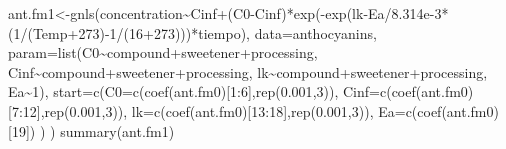 \documentclass[
]{article}
\newenvironment{Shaded}{\begin{snugshade}}{\end{snugshade}}
\newcommand{\AttributeTok}[1]{\textcolor[rgb]{0.77,0.63,0.00}{#1}}
\newcommand{\DecValTok}[1]{\textcolor[rgb]{0.00,0.00,0.81}{#1}}
\newcommand{\FloatTok}[1]{\textcolor[rgb]{0.00,0.00,0.81}{#1}}
\newcommand{\FunctionTok}[1]{\textcolor[rgb]{0.00,0.00,0.00}{#1}}
\newcommand{\NormalTok}[1]{#1}
\newcommand{\OtherTok}[1]{\textcolor[rgb]{0.56,0.35,0.01}{#1}}
\newcommand{\SpecialCharTok}[1]{\textcolor[rgb]{0.00,0.00,0.00}{#1}}
\begin{document}
\begin{Shaded}
\begin{Highlighting}[]
\NormalTok{ant.fm1}\OtherTok{\textless{}{-}}\FunctionTok{gnls}\NormalTok{(concentration}\SpecialCharTok{\textasciitilde{}}\NormalTok{Cinf}\SpecialCharTok{+}\NormalTok{(C0}\SpecialCharTok{{-}}\NormalTok{Cinf)}\SpecialCharTok{*}\FunctionTok{exp}\NormalTok{(}\SpecialCharTok{{-}}\FunctionTok{exp}\NormalTok{(lk}\SpecialCharTok{{-}}\NormalTok{Ea}\SpecialCharTok{/}\FloatTok{8.314e{-}3}\SpecialCharTok{*}\NormalTok{(}\DecValTok{1}\SpecialCharTok{/}\NormalTok{(Temp}\SpecialCharTok{+}\DecValTok{273}\NormalTok{)}\SpecialCharTok{{-}}\DecValTok{1}\SpecialCharTok{/}\NormalTok{(}\DecValTok{16}\SpecialCharTok{+}\DecValTok{273}\NormalTok{)))}\SpecialCharTok{*}\NormalTok{tiempo),}
              \AttributeTok{data=}\NormalTok{anthocyanins,}
              \AttributeTok{param=}\FunctionTok{list}\NormalTok{(C0}\SpecialCharTok{\textasciitilde{}}\NormalTok{compound}\SpecialCharTok{+}\NormalTok{sweetener}\SpecialCharTok{+}\NormalTok{processing,}
\NormalTok{                         Cinf}\SpecialCharTok{\textasciitilde{}}\NormalTok{compound}\SpecialCharTok{+}\NormalTok{sweetener}\SpecialCharTok{+}\NormalTok{processing,}
\NormalTok{                         lk}\SpecialCharTok{\textasciitilde{}}\NormalTok{compound}\SpecialCharTok{+}\NormalTok{sweetener}\SpecialCharTok{+}\NormalTok{processing,}
\NormalTok{                         Ea}\SpecialCharTok{\textasciitilde{}}\DecValTok{1}\NormalTok{),}
              \AttributeTok{start=}\FunctionTok{c}\NormalTok{(}\AttributeTok{C0=}\FunctionTok{c}\NormalTok{(}\FunctionTok{coef}\NormalTok{(ant.fm0)[}\DecValTok{1}\SpecialCharTok{:}\DecValTok{6}\NormalTok{],}\FunctionTok{rep}\NormalTok{(}\FloatTok{0.001}\NormalTok{,}\DecValTok{3}\NormalTok{)),}
                      \AttributeTok{Cinf=}\FunctionTok{c}\NormalTok{(}\FunctionTok{coef}\NormalTok{(ant.fm0)[}\DecValTok{7}\SpecialCharTok{:}\DecValTok{12}\NormalTok{],}\FunctionTok{rep}\NormalTok{(}\FloatTok{0.001}\NormalTok{,}\DecValTok{3}\NormalTok{)),}
                      \AttributeTok{lk=}\FunctionTok{c}\NormalTok{(}\FunctionTok{coef}\NormalTok{(ant.fm0)[}\DecValTok{13}\SpecialCharTok{:}\DecValTok{18}\NormalTok{],}\FunctionTok{rep}\NormalTok{(}\FloatTok{0.001}\NormalTok{,}\DecValTok{3}\NormalTok{)),}
                      \AttributeTok{Ea=}\FunctionTok{c}\NormalTok{(}\FunctionTok{coef}\NormalTok{(ant.fm0)[}\DecValTok{19}\NormalTok{])}
\NormalTok{                      )}
\NormalTok{)}
\FunctionTok{summary}\NormalTok{(ant.fm1)}
\end{Highlighting}
\end{Shaded}
\end{document}
